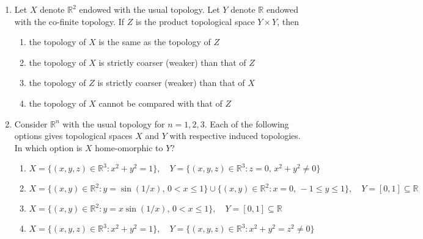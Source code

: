 \documentclass[journal]{IEEEtran}
\begin{document}
\begin{enumerate}
\item Let \( X \) denote \( \mathbb{R}^2 \) endowed with the usual topology. Let \( Y \) denote \( \mathbb{R} \) endowed with the co-finite topology. If \( Z \) is the product topological space \( Y \times Y \), then

\begin{enumerate}
    \item the topology of \( X \) is the same as the topology of \( Z \)
    \item the topology of \( X \) is strictly coarser (weaker) than that of \( Z \)
    \item the topology of \( Z \) is strictly coarser (weaker) than that of \( X \)
    \item the topology of \( X \) cannot be compared with that of \( Z \)
\end{enumerate}
\vspace{0.5cm}
\item Consider \( \mathbb{R}^n \) with the usual topology for \( n = 1, 2, 3 \). Each of the following options gives topological spaces \( X \) and \( Y \) with respective induced topologies. In which option is \( X \) home-omorphic to \( Y \)?

\begin{enumerate}
    \item \( X = \{(x, y, z) \in \mathbb{R}^3 : x^2 + y^2 = 1\}, \quad Y = \{(x, y, z) \in \mathbb{R}^3 : z = 0, \, x^2 + y^2 \neq 0\} \)
    \item \( X = \{(x, y) \in \mathbb{R}^2 : y = \sin(1/x), \, 0 < x \leq 1\} \cup \{(x, y) \in \mathbb{R}^2 : x = 0, \, -1 \leq y \leq 1\}, \quad Y = [0, 1] \subseteq\mathbb{R} \)
    \item \( X = \{(x, y) \in \mathbb{R}^2 : y = x \sin(1/x), \, 0 < x \leq 1\}, \quad Y = [0, 1] \subseteq \mathbb{R} \)
    \item \( X = \{(x, y, z) \in \mathbb{R}^3 : x^2 + y^2 = 1\}, \quad Y = \{(x, y, z) \in \mathbb{R}^3 : x^2 + y^2 = z^2 \neq 0\} \)
\end{enumerate}

\vspace{0.5cm}


\end{enumerate}
\end{document}
